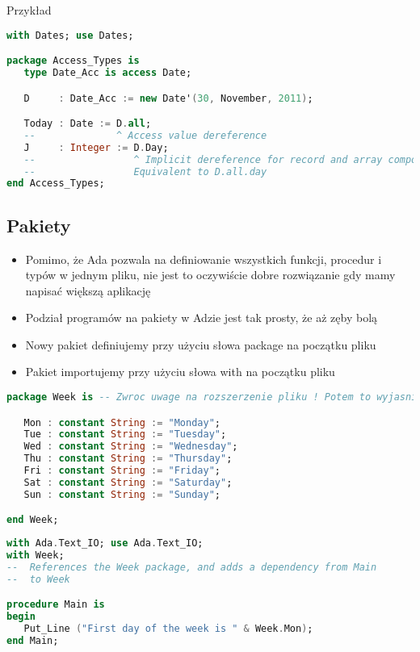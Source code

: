 \documentclass[a4paper,15pt]{article}
\begin{document}
Przykład
\begin{lstlisting}[language=Ada, caption=Dereferencja]
with Dates; use Dates;

package Access_Types is
   type Date_Acc is access Date;

   D     : Date_Acc := new Date'(30, November, 2011);

   Today : Date := D.all;
   --              ^ Access value dereference
   J     : Integer := D.Day;
   --                 ^ Implicit dereference for record and array components
   --                 Equivalent to D.all.day
end Access_Types;
\end{lstlisting}

\subsection{Pakiety}

\begin{itemize}
\item Pomimo, że Ada pozwala na definiowanie wszystkich funkcji, procedur i typów w jednym pliku, nie jest to oczywiście dobre rozwiązanie gdy mamy napisać większą aplikację
\item Podział programów na pakiety w Adzie jest tak prosty, że aż zęby bolą
\item Nowy pakiet definiujemy przy użyciu słowa package na początku pliku
\item Pakiet importujemy przy użyciu słowa with na początku pliku
\end{itemize}

\begin{lstlisting}[language=Ada, caption=Definicja pakietu - plik week.ads]
package Week is -- Zwroc uwage na rozszerzenie pliku ! Potem to wyjasnimy !

   Mon : constant String := "Monday";
   Tue : constant String := "Tuesday";
   Wed : constant String := "Wednesday";
   Thu : constant String := "Thursday";
   Fri : constant String := "Friday";
   Sat : constant String := "Saturday";
   Sun : constant String := "Sunday";

end Week; 
\end{lstlisting}


\begin{lstlisting}[language=Ada, caption=Uzycie pakietu]
with Ada.Text_IO; use Ada.Text_IO;
with Week;
--  References the Week package, and adds a dependency from Main
--  to Week

procedure Main is
begin
   Put_Line ("First day of the week is " & Week.Mon);
end Main;
\end{lstlisting}
\end{document}
